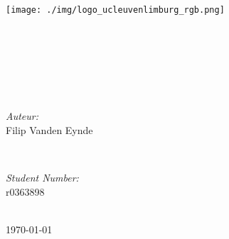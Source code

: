 \begin{titlepage}
	\centering
    \vspace*{0.5 cm}
    \texttt{[image: ./img/logo\_ucleuvenlimburg\_rgb.png]}\\[1cm]%
    \textsc{\Huge	 \naamschool}\\[2.0 cm]	%

\textsc{\huge \coursecode}\\[1.5 cm]				%

\textsc{\huge \info}\\[0.5 cm]				%
\HRule \\[0.6cm]
	{\huge \bfseries \thetitle}\\[0.4cm]
	\HRule \\[1.5cm]


	\begin{minipage}{0.4\textwidth}
		\begin{flushleft} \large
			\emph{Auteur:}\\
			Filip Vanden Eynde
			\end{flushleft}
			\end{minipage}~
			\begin{minipage}{0.4\textwidth}
			\begin{flushright} \large
			\emph{Student Number:} \\
			r0363898									%
		\end{flushright}
	\end{minipage}\\[3 cm]  %

	

	{\large \today}%

	\vfill
	
\end{titlepage}
